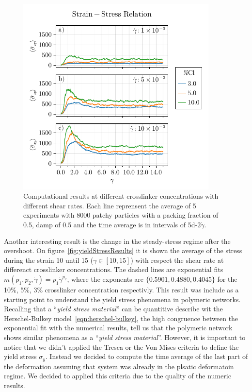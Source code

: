 \begin{figure}[ht!]
    \centering
    \includegraphics[width=0.9\textwidth]{figs/ComputaitonalResults/zoom-clResponse.pdf}
    \caption{Computational results at different crosslinker concentrations with different shear rates. Each line reprensent the average of 5 experiments with \num{8000} patchy particles with a packing fraction of \num{0.5}, damp of \num{0.5} and the time average is in intervals of \num{5d-2}$\dot{\gamma}$.}\label{fig:stress-strainCLResults}
\end{figure}

Another interesting result is the change in the steady-stress regime after the overshoot.
On figure~\ref{fig:yieldStressResults} it is shown the average of the stress during the strain \num{10} until \num{15} ($\gamma\in[10,15]$) with respect the shear rate at differenct crosslinker concentrations.
The dashed lines are exponential fits $m(p_1,p_2,\dot{\gamma}) = p_1\dot{\gamma}^{p_2}$, where the exponents are $\{0.5901,0.4880,0.4045\}$ for the \num{10}\%, \num{5}\%, \num{3}\% crosslinker concentration respectivly.
This result was include as a starting point to understand the yield stress phenomena in polymeric networks.
Recalling that a ``\textit{yield stress material}'' can be quantitive describe wit the Herschel-Bulkey model~\eqref{eqn:herschel-bulkey}, the high congruence between the exponential fit with the numerical results, tell us that the polymeric network shows similar phenomena as a ``\textit{yield stress material}''.
However, it is important to notice that we didn't applied the Tresca or the Von Mises criteria to define the yield stress $\sigma_y$.
Instead we decided to compute the time average of the last part of the deformation assuming that system was already in the plsatic deformatoin regime.
We decided to applied this criteria due to the quality of the numeric results.

